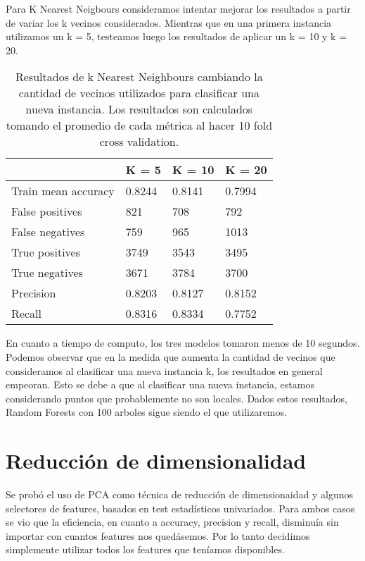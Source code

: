\documentclass[10pt,a4paper]{article}
\begin{document}
Para K Nearest Neigbours consideramos intentar mejorar los resultados a partir de variar los k vecinos considerados. Mientras que en una primera instancia utilizamos un k = 5, testeamos luego los resultados de aplicar un k = 10 y k = 20.

\begin{table}[H]
	\centering
	\label{my-label}
	\begin{tabular}{|l|l|l|l|}
		\hline
		\multicolumn{1}{|c|}{\textbf{}} & \multicolumn{1}{c|}{\textbf{K = 5}} & \multicolumn{1}{c|}{\textbf{K = 10}} & \multicolumn{1}{c|}{\textbf{K = 20}} \\ \hline
Train mean accuracy & 0.8244 & 0.8141 & 0.7994 \\ \hline
False positives     & 821 & 708 & 792 \\ \hline
False negatives     & 759 & 965 & 1013 \\ \hline
True positives      & 3749 & 3543 & 3495 \\ \hline
True negatives      & 3671 & 3784 & 3700 \\ \hline
Precision           & 0.8203 & 0.8127 & 0.8152 \\ \hline
Recall              & 0.8316 & 0.8334 & 0.7752 \\ \hline
	\end{tabular}
	\caption{Resultados de k Nearest Neighbours cambiando la cantidad de vecinos utilizados para clasificar una nueva instancia. Los resultados son calculados tomando el promedio de cada métrica al hacer 10 fold cross validation.}
	\label{rf}
\end{table}

En cuanto a tiempo de computo, los tres modelos tomaron menos de 10 segundos. Podemos observar que en la medida que aumenta la cantidad de vecinos que consideramos al clasificar una nueva instancia k, los resultados en general empeoran. Esto se debe a que al clasificar una nueva instancia, estamos considerando puntos que probablemente no son locales. Dados estos resultados, Random Forests con 100 arboles sigue siendo el que utilizaremos.

\section{Reducción de dimensionalidad}

Se probó el uso de PCA como técnica de reducción de dimensionaidad y algunos selectores de features, basados en test estadísticos univariados. Para ambos casos se vio que la eficiencia, en cuanto a accuracy, precision y recall, disminuía sin importar con cuantos features nos quedásemos. Por lo tanto decidimos simplemente utilizar todos los features que teníamos disponibles.
\end{document}
